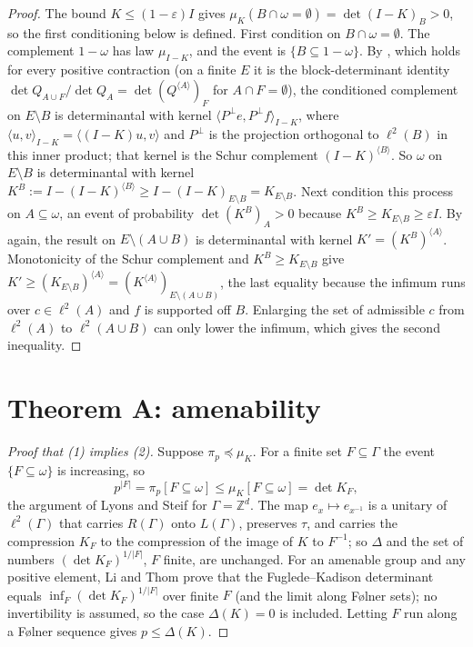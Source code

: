 \documentclass[11pt]{amsart}
\theoremstyle{remark}
\theoremstyle{definition}
\newcommand{\Ga}{\Gamma}
\newcommand{\FK}{\Delta}
\newcommand{\tr}{\tau}
\newcommand{\dom}{\preccurlyeq}
\newcommand{\ltwo}{\ell^2}
\begin{document}
\begin{proof}
The bound $K\le(1-\varepsilon)I$ gives $\mu_K(B\cap\omega=\emptyset)=\det(I-K)_B>0$, so the first conditioning below is
defined. First condition on $B\cap\omega=\emptyset$. The complement $1-\omega$ has law $\mu_{I-K}$, and the event is
$\{B\subseteq1-\omega\}$. By \cite[Prop.~8.3]{Ly03}, which holds for every positive contraction (on a finite $E$ it is the block-determinant
identity $\det Q_{A\cup F}/\det Q_A=\det(Q^{\langle A\rangle})_F$ for $A\cap F=\emptyset$), the conditioned
complement on $E\setminus B$ is determinantal with kernel $\langle P^{\perp}e,P^{\perp}f\rangle_{I-K}$, where
$\langle u,v\rangle_{I-K}=\langle(I-K)u,v\rangle$ and $P^\perp$ is the projection orthogonal to $\ltwo(B)$ in this inner
product; that kernel is the Schur complement $(I-K)^{\langle B\rangle}$. So $\omega$ on $E\setminus B$ is determinantal
with kernel $K^{B}:=I-(I-K)^{\langle B\rangle}\ge I-(I-K)_{E\setminus B}=K_{E\setminus B}$. Next condition this process
on $A\subseteq\omega$, an event of probability $\det(K^B)_A>0$ because $K^B\ge K_{E\setminus B}\ge\varepsilon I$. By
\cite[Prop.~8.3]{Ly03} again, the result on $E\setminus(A\cup B)$ is determinantal with kernel $K'=(K^B)^{\langle
A\rangle}$. Monotonicity of the Schur complement and $K^B\ge K_{E\setminus B}$ give
$K'\ge(K_{E\setminus B})^{\langle A\rangle}=(K^{\langle A\rangle})_{E\setminus(A\cup B)}$, the last equality because the
infimum runs over $c\in\ltwo(A)$ and $f$ is supported off $B$. Enlarging the set of admissible $c$ from $\ltwo(A)$ to
$\ltwo(A\cup B)$ can only lower the infimum, which gives the second inequality.
\end{proof}

\section{Theorem A: amenability}\label{sec:A}

\begin{proof}[Proof that (1) implies (2)]
Suppose $\pi_p\dom\mu_K$. For a finite set $F\subseteq\Ga$ the event $\{F\subseteq\omega\}$ is increasing, so
\[
p^{|F|}=\pi_p[F\subseteq\omega]\le\mu_K[F\subseteq\omega]=\det K_F ,
\]
the argument of Lyons and Steif \cite{LS03} for $\Ga=\mathbb Z^d$. The map $e_x\mapsto e_{x^{-1}}$ is a unitary of
$\ltwo(\Ga)$ that carries $R(\Ga)$ onto $L(\Ga)$, preserves $\tr$, and carries the compression $K_F$ to the compression
of the image of $K$ to $F^{-1}$; so $\FK$ and the set of numbers $(\det K_F)^{1/|F|}$, $F$ finite, are unchanged.
For an amenable group and any positive element, Li and Thom \cite[Thm.~1.4]{LT14} prove that the Fuglede--Kadison
determinant equals $\inf_F(\det K_F)^{1/|F|}$ over finite $F$ (and the limit along F{\o}lner sets); no invertibility
is assumed, so the case $\FK(K)=0$ is included. Letting $F$ run along a F{\o}lner sequence gives $p\le\FK(K)$.
\end{proof}
\end{document}
